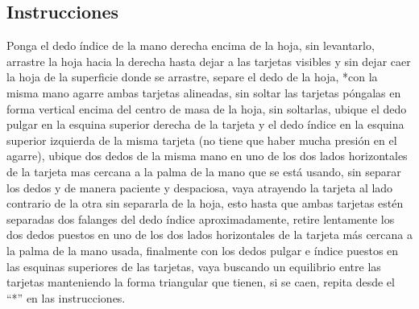 \documentclass{article}
\begin{document}
\subsection{Instrucciones}
Ponga el dedo índice de la mano derecha encima de la hoja, sin levantarlo, arrastre la hoja hacia la derecha hasta dejar a las tarjetas visibles y sin dejar caer la hoja de la superficie donde se arrastre, separe el dedo de la hoja, *con la misma mano agarre ambas tarjetas alineadas, sin soltar las tarjetas póngalas en forma vertical encima del centro de masa de la hoja, sin soltarlas, ubique el dedo pulgar en la esquina superior derecha de la tarjeta y el dedo índice en la esquina superior izquierda de la misma tarjeta (no tiene que haber mucha presión en el agarre), ubique dos dedos de la misma mano en uno de los dos lados horizontales de la tarjeta mas cercana a la palma de la mano que se está usando, sin separar los dedos y de manera paciente y despaciosa, vaya atrayendo la tarjeta al lado contrario de la otra sin separarla de la hoja, esto hasta que ambas tarjetas estén separadas dos falanges del dedo índice aproximadamente, retire lentamente los dos dedos puestos en uno de los dos lados horizontales de la tarjeta más cercana a la palma de la mano usada, finalmente con los dedos pulgar e índice puestos en las esquinas superiores de las tarjetas, vaya buscando un equilibrio entre las tarjetas manteniendo la forma triangular que tienen, si se caen, repita desde el “*” en las instrucciones.




\end{document}
